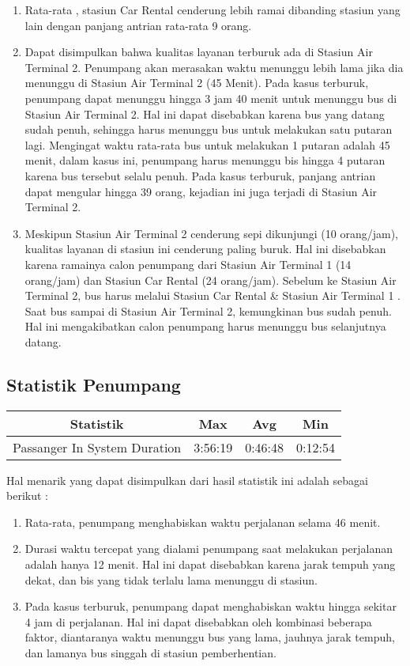 \documentclass{article}
\begin{document}
\begin{enumerate}
	\item Rata-rata , stasiun Car Rental cenderung lebih ramai dibanding stasiun yang lain dengan panjang antrian rata-rata 9 orang. 
	\item Dapat disimpulkan bahwa kualitas layanan terburuk ada di Stasiun Air Terminal 2. Penumpang akan merasakan waktu menunggu lebih lama jika dia menunggu di Stasiun Air Terminal 2 (45 Menit). Pada kasus terburuk, penumpang dapat menunggu hingga 3 jam 40 menit untuk menunggu bus di Stasiun Air Terminal 2. Hal ini dapat disebabkan karena bus yang datang sudah penuh, sehingga harus menunggu bus untuk melakukan satu putaran lagi. Mengingat waktu rata-rata bus untuk melakukan 1 putaran adalah 45 menit, dalam kasus ini, penumpang harus menunggu bis hingga 4 putaran karena bus tersebut selalu penuh. Pada kasus terburuk, panjang antrian dapat mengular hingga 39 orang, kejadian ini juga terjadi di Stasiun Air Terminal 2.
	\item Meskipun Stasiun Air Terminal 2 cenderung sepi dikunjungi (10 orang/jam), kualitas layanan di stasiun ini cenderung paling buruk. Hal ini disebabkan karena ramainya calon penumpang dari Stasiun Air Terminal 1 (14 orang/jam) dan Stasiun Car Rental (24 orang/jam). Sebelum ke Stasiun Air Terminal 2, bus harus melalui Stasiun Car Rental \& Stasiun Air Terminal 1 . Saat bus sampai di Stasiun Air Terminal 2, kemungkinan bus sudah penuh. Hal ini mengakibatkan calon penumpang harus menunggu bus selanjutnya datang. 
\end{enumerate}  


\subsection{Statistik Penumpang}

\begin{center}
 \begin{tabular}{||c | c | c | c||} 
 \hline
 Statistik & Max & Avg & Min \\ [0.5ex] 
 \hline\hline
 Passanger In System Duration & 3:56:19 & 0:46:48 & 0:12:54 \\ 
 \hline
\end{tabular}
\end{center}


Hal menarik yang dapat disimpulkan dari hasil statistik ini adalah sebagai berikut :

\begin{enumerate}
	\item Rata-rata, penumpang menghabiskan waktu perjalanan selama 46 menit.
	\item Durasi waktu tercepat yang dialami penumpang saat melakukan perjalanan adalah hanya 12 menit. Hal ini dapat disebabkan karena jarak tempuh yang dekat, dan bis yang tidak terlalu lama menunggu di stasiun.
	\item Pada kasus terburuk, penumpang dapat menghabiskan waktu hingga sekitar 4 jam di perjalanan. Hal ini dapat disebabkan oleh kombinasi beberapa faktor, diantaranya waktu menunggu bus yang lama, jauhnya jarak tempuh, dan lamanya bus singgah di stasiun pemberhentian.	
\end{enumerate}  
\end{document}
